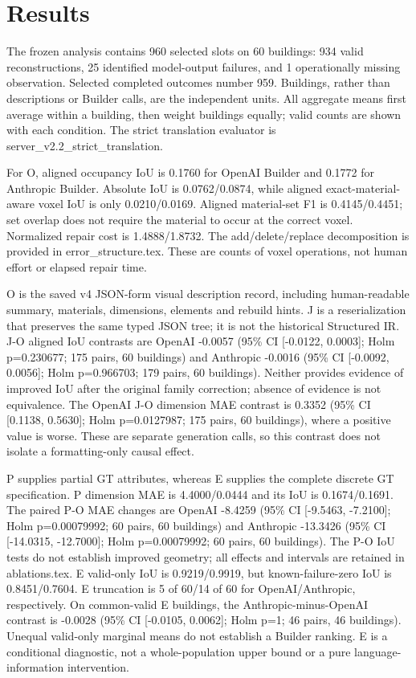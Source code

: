 \section{Results}

The frozen analysis contains 960 selected slots on 60 buildings: 934 valid reconstructions, 25 identified model-output failures, and 1 operationally missing observation. Selected completed outcomes number 959. Buildings, rather than descriptions or Builder calls, are the independent units. All aggregate means first average within a building, then weight buildings equally; valid counts are shown with each condition. The strict translation evaluator is server\_v2.2\_strict\_translation.

For O, aligned occupancy IoU is 0.1760 for OpenAI Builder and 0.1772 for Anthropic Builder. Absolute IoU is 0.0762/0.0874, while aligned exact-material-aware voxel IoU is only 0.0210/0.0169. Aligned material-set F1 is 0.4145/0.4451; set overlap does not require the material to occur at the correct voxel. Normalized repair cost is 1.4888/1.8732. The add/delete/replace decomposition is provided in error\_structure.tex. These are counts of voxel operations, not human effort or elapsed repair time.

O is the saved v4 JSON-form visual description record, including human-readable summary, materials, dimensions, elements and rebuild hints. J is a reserialization that preserves the same typed JSON tree; it is not the historical Structured IR. J-O aligned IoU contrasts are OpenAI -0.0057 (95\% CI [-0.0122, 0.0003]; Holm p=0.230677; 175 pairs, 60 buildings) and Anthropic -0.0016 (95\% CI [-0.0092, 0.0056]; Holm p=0.966703; 179 pairs, 60 buildings). Neither provides evidence of improved IoU after the original family correction; absence of evidence is not equivalence. The OpenAI J-O dimension MAE contrast is 0.3352 (95\% CI [0.1138, 0.5630]; Holm p=0.0127987; 175 pairs, 60 buildings), where a positive value is worse. These are separate generation calls, so this contrast does not isolate a formatting-only causal effect.

P supplies partial GT attributes, whereas E supplies the complete discrete GT specification. P dimension MAE is 4.4000/0.0444 and its IoU is 0.1674/0.1691. The paired P-O MAE changes are OpenAI -8.4259 (95\% CI [-9.5463, -7.2100]; Holm p=0.00079992; 60 pairs, 60 buildings) and Anthropic -13.3426 (95\% CI [-14.0315, -12.7000]; Holm p=0.00079992; 60 pairs, 60 buildings). The P-O IoU tests do not establish improved geometry; all effects and intervals are retained in ablations.tex. E valid-only IoU is 0.9219/0.9919, but known-failure-zero IoU is 0.8451/0.7604. E truncation is 5 of 60/14 of 60 for OpenAI/Anthropic, respectively. On common-valid E buildings, the Anthropic-minus-OpenAI contrast is -0.0028 (95\% CI [-0.0105, 0.0062]; Holm p=1; 46 pairs, 46 buildings). Unequal valid-only marginal means do not establish a Builder ranking. E is a conditional diagnostic, not a whole-population upper bound or a pure language-information intervention.

